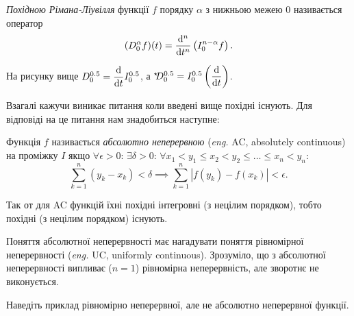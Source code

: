 \begin{definition}
    \textit{Похідною Рімана-Ліувілля} функції $f$ порядку $\alpha$ з нижньою межею $0$ називається оператор
    \begin{equation}
        (D_0^{\alpha} f)(t) = \frac{\mathop{}\!\mathrm{d}^n}{\mathop{}\!\mathrm{d} t^n} \left( I_0^{n - \alpha} f \right).
    \end{equation}
\end{definition}

\begin{example}
    На рисунку вище $D_0^{0.5} = \dfrac{\mathop{}\!\mathrm{d}}{\mathop{}\!\mathrm{d} t} I_0^{0.5}$, а ${}^{\star\!\!}D_0^{0.5} = I_0^{0.5} \left( \dfrac{\mathop{}\!\mathrm{d}}{\mathop{}\!\mathrm{d} t} \right)$.
\end{example}

Взагалі кажучи виникає питання коли введені вище похідні існують. Для відповіді на це питання нам знадобиться наступне:
\begin{definition}
    Функція $f$ називається \textit{абсолютно неперервною} (\textit{eng.} AC, absolutely continuous) на проміжку $I$ якщо $\forall \epsilon > 0$: $\exists \delta > 0$: $\forall x_1 < y_1 \le x_2 < y_2 \le \ldots \le x_n < y_n$:
    \begin{equation}
        \sum_{k = 1}^n (y_k - x_k) < \delta \implies \sum_{k = 1}^n |f(y_k) - f(x_k)| < \epsilon.
    \end{equation}
\end{definition}

Так от для AC функцій їхні похідні інтегровні (з нецілим порядком), тобто похідні (з нецілим порядком) існують. \medskip

Поняття абсолютної неперервності має нагадувати поняття рівномірної неперервності (\textit{eng.} UC, uniformly continuous). Зрозуміло, що з абсолютної неперервності випливає ($n = 1$) рівномірна неперервність, але зворотнє не виконується.

\begin{exercise}
    Наведіть приклад рівномірно неперервної, але не абсолютно неперервної функції.
\end{exercise}

